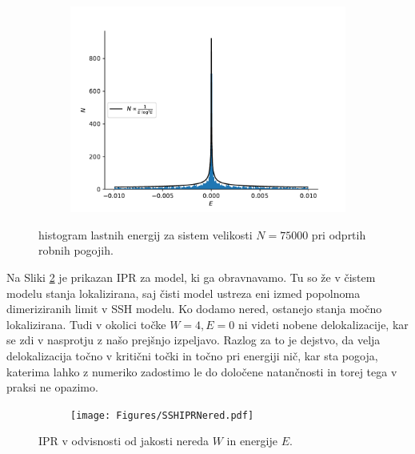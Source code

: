 \begin{figure}[H]
\centering
\begin{subfigure}{.9\textwidth}
\includegraphics[width=\linewidth]{Figures/DOS.pdf}
\end{subfigure}
\caption{histogram lastnih energij za sistem velikosti $N=75000$ pri odprtih robnih pogojih.}
\label{fig:dos}
\end{figure}

Na Sliki \ref{fig:SSHIPRNered} je prikazan IPR za model, ki ga obravnavamo. Tu so že v čistem modelu stanja lokalizirana, saj čisti model ustreza eni izmed popolnoma dimeriziranih limit v SSH modelu. Ko dodamo nered, ostanejo stanja močno lokalizirana. Tudi v okolici točke $W=4, E=0$ ni videti nobene delokalizacije, kar se zdi v nasprotju z našo prejšnjo izpeljavo. Razlog za to je dejstvo, da velja delokalizacija točno v kritični točki in točno pri energiji nič, kar sta pogoja, katerima lahko z numeriko zadostimo le do določene natančnosti in torej tega v praksi ne opazimo.

\begin{figure}[H]
\centering
\begin{subfigure}{.7\textwidth}
\texttt{[image: Figures/SSHIPRNered.pdf]}
\end{subfigure}
\caption{IPR v odvisnosti od jakosti nereda $W$ in energije $E$.}
\label{fig:SSHIPRNered}
\end{figure}

